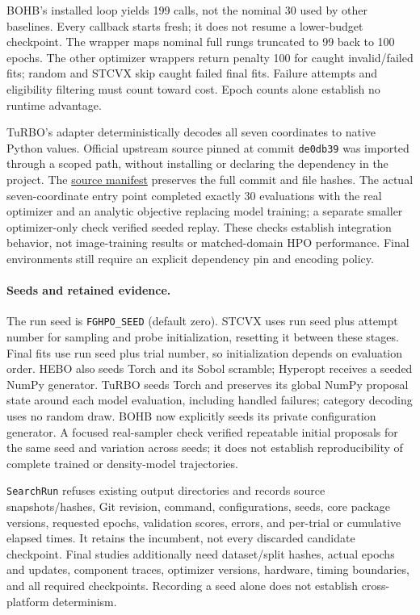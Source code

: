 BOHB's installed loop yields 199 calls, not the nominal 30 used by other baselines. Every callback starts fresh; it does not resume a lower-budget checkpoint. The wrapper maps nominal full rungs truncated to 99 back to 100 epochs. The other optimizer wrappers return penalty 100 for caught invalid/failed fits; random and STCVX skip caught failed final fits. Failure attempts and eligibility filtering must count toward cost. Epoch counts alone establish no runtime advantage.

TuRBO's adapter deterministically decodes all seven coordinates to native Python values. Official upstream source pinned at commit \texttt{de0db39} was imported through a scoped path, without installing or declaring the dependency in the project. The \href{run:../sweep-results/research-audit-20261002/turbo-integration/upstream/acquisition-manifest.json}{source manifest} preserves the full commit and file hashes. The actual seven-coordinate entry point completed exactly 30 evaluations with the real optimizer and an analytic objective replacing model training; a separate smaller optimizer-only check verified seeded replay. These checks establish integration behavior, not image-training results or matched-domain HPO performance. Final environments still require an explicit dependency pin and encoding policy.

\paragraph{Seeds and retained evidence.}
The run seed is \texttt{FGHPO\_SEED} (default zero). STCVX uses run seed plus attempt number for sampling and probe initialization, resetting it between these stages. Final fits use run seed plus trial number, so initialization depends on evaluation order. HEBO also seeds Torch and its Sobol scramble; Hyperopt receives a seeded NumPy generator. TuRBO seeds Torch and preserves its global NumPy proposal state around each model evaluation, including handled failures; category decoding uses no random draw. BOHB now explicitly seeds its private configuration generator. A focused real-sampler check verified repeatable initial proposals for the same seed and variation across seeds; it does not establish reproducibility of complete trained or density-model trajectories.

\texttt{SearchRun} refuses existing output directories and records source snapshots/hashes, Git revision, command, configurations, seeds, core package versions, requested epochs, validation scores, errors, and per-trial or cumulative elapsed times. It retains the incumbent, not every discarded candidate checkpoint. Final studies additionally need dataset/split hashes, actual epochs and updates, component traces, optimizer versions, hardware, timing boundaries, and all required checkpoints. Recording a seed alone does not establish cross-platform determinism.

